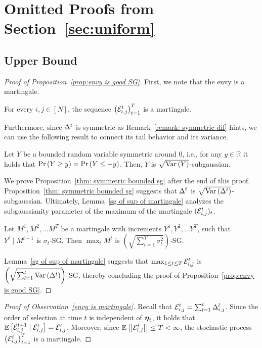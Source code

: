 \section{Omitted Proofs from Section~\ref{sec:uniform}}\label{appendix:uni}
\subsection{Upper Bound}
\begin{proof}[Proof of Proposition~\ref{prop:envy is good SG}]
First, we note that the envy is a martingale.
\begin{observation}\label{envy is martingale}
For every $i,j\in[N]$, the sequence $\left(\mathcal{E}_{i,j}^t \right)_{t=1}^T$ is a martingale. 
\end{observation}
Furthermore, since ${\Delta^t}$ is symmetric as Remark~\ref{remark: symmetric dif} hints, we can use the following result to connect its tail behavior and its variance. 
\begin{proposition}\label{thm: symmetric bounded sg}
Let $Y$ be a bounded random variable symmetric around $0$, i.e., for any $y \in \mathbb R$ it holds that $\Pr\left( Y \geq y \right) = \Pr\left( Y \leq -y \right)$. Then, $Y$ is $\sqrt{\mathrm{Var}\left( Y \right)}$-subgaussian.
\end{proposition}
We prove Proposition~\ref{thm: symmetric bounded sg} after the end of this proof. Proposition~\ref{thm: symmetric bounded sg} suggests that ${\Delta^t}$ is $\sqrt{\mathrm{Var}\left( {\Delta^t} \right)}$-subgaussian. Ultimately, Lemma~\ref{sg of sup of martingale} analyzes the subgaussianity parameter of the maximum of the martingale $(\mathcal{E}_{i,j}^t )_t$.
\begin{lemma}\label{sg of sup of martingale}
    Let $M^1, M^2,\dots M^T$ be a martingale with increments $Y^1,Y^2,\dots Y^T$, such that $Y^t \mid M^{t-1}$ is $\sigma_t$-SG. Then $\max_t M^t$ is $\left(\sqrt{\sum_{t=1}^T \sigma_t^2}\right)$-SG.
\end{lemma}
Lemma~\ref{sg of sup of martingale} suggests that $\max_{1\leq t\leq T} \mathcal{E}_{i,j}^t $ is 
$\left(\sqrt{\sum_{l=1}^t \mathrm{Var}\left( {\Delta^t} \right)}\right)$-SG, thereby concluding the proof of  Proposition~\ref{prop:envy is good SG}.
\end{proof}


\begin{proof}[Proof of Observation~\ref{envy is martingale}]
Recall that $\mathcal{E}_{i,j}^t = \sum^{t}_{l=1}{\Delta^{l}_{i,j}}$. Since the order of selection at time $t$ is independent of $\boldsymbol{\eta}_t$, it holds that $\mathbb{E}\left[ \mathcal{E}_{i,j}^{t+1}\mid \mathcal{E}_{i,j}^t \right] =\mathcal{E}_{i,j}^t$. Moreover, since $\mathbb{E}\left[ \left\lvert\mathcal{E}_{i,j}^t\right\rvert \right] \leq  T < \infty$, the stochastic process $\left(\mathcal{E}_{i,j}^t \right)_{t=1}^T$ is a martingale. 
\end{proof}

